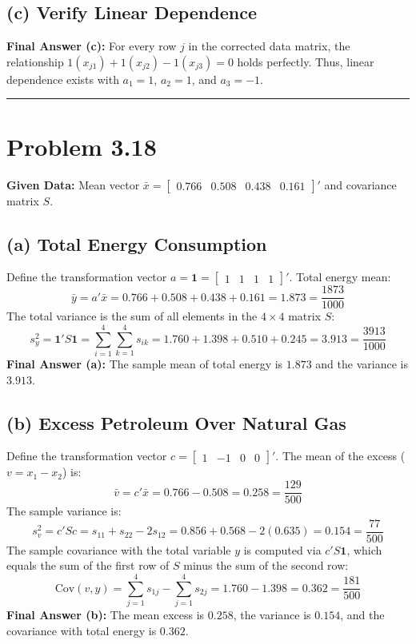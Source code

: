 \documentclass[12pt]{article}
\begin{document}
\subsection*{(c) Verify Linear Dependence}
\textbf{Final Answer (c):} For every row $j$ in the corrected data matrix, the relationship $1(x_{j1}) + 1(x_{j2}) - 1(x_{j3}) = 0$ holds perfectly. Thus, linear dependence exists with $a_1=1$, $a_2=1$, and $a_3=-1$.

\rule{\textwidth}{0.4pt}

\section*{Problem 3.18}
\textbf{Given Data:} Mean vector $\bar{x} = \begin{bmatrix} 0.766 & 0.508 & 0.438 & 0.161 \end{bmatrix}'$ and covariance matrix $S$.

\subsection*{(a) Total Energy Consumption}
Define the transformation vector $a = \mathbf{1} = \begin{bmatrix} 1 & 1 & 1 & 1 \end{bmatrix}'$.
Total energy mean:
$$ \bar{y} = a'\bar{x} = 0.766 + 0.508 + 0.438 + 0.161 = 1.873 = \frac{1873}{1000} $$
The total variance is the sum of all elements in the $4 \times 4$ matrix $S$:
$$ s_y^2 = \mathbf{1}' S \mathbf{1} = \sum_{i=1}^4 \sum_{k=1}^4 s_{ik} = 1.760 + 1.398 + 0.510 + 0.245 = 3.913 = \frac{3913}{1000} $$
\textbf{Final Answer (a):} The sample mean of total energy is $1.873$ and the variance is $3.913$.

\subsection*{(b) Excess Petroleum Over Natural Gas}
Define the transformation vector $c = \begin{bmatrix} 1 & -1 & 0 & 0 \end{bmatrix}'$. 
The mean of the excess ($v = x_1 - x_2$) is:
$$ \bar{v} = c'\bar{x} = 0.766 - 0.508 = 0.258 = \frac{129}{500} $$
The sample variance is:
$$ s_v^2 = c'Sc = s_{11} + s_{22} - 2s_{12} = 0.856 + 0.568 - 2(0.635) = 0.154 = \frac{77}{500} $$
The sample covariance with the total variable $y$ is computed via $c'S\mathbf{1}$, which equals the sum of the first row of $S$ minus the sum of the second row:
$$ \text{Cov}(v, y) = \sum_{j=1}^4 s_{1j} - \sum_{j=1}^4 s_{2j} = 1.760 - 1.398 = 0.362 = \frac{181}{500} $$
\textbf{Final Answer (b):} The mean excess is $0.258$, the variance is $0.154$, and the covariance with total energy is $0.362$.
\end{document}
